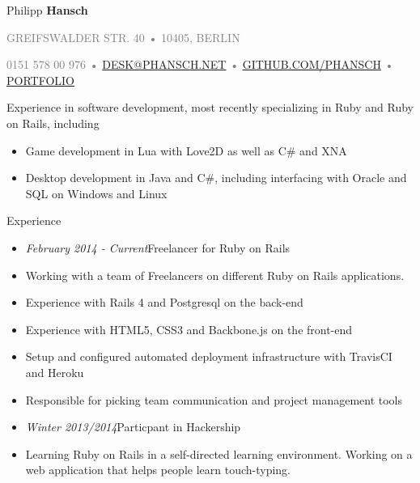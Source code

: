 \documentclass[12pt]{article}
\begin{document}
\thispagestyle{empty}



{\Huge Philipp \textbf{Hansch}}

{\footnotesize
  \textcolor{Gray}{
    \uppercase{Greifswalder Str. 40}
    •
    \uppercase{10405, Berlin}
  }

  \textcolor{Gray}{
    0151 578 00 976
    •
    \href{mailto:desk@phansch.net}{\uppercase{desk@phansch.net}}
    •
    \href{http://github.com/phansch}{\uppercase{github.com/phansch}}
    •
    \href{http://portfolio.phansch.net/\#folio-mid}{\uppercase{Portfolio}}
  }
}

\vspace{0.5cm}

Experience in software development, most recently specializing in Ruby and Ruby on Rails, including

\begin{itemize}
  \setlength{\itemsep}{0.1cm}
  \setlength{\parskip}{0.1cm}
  \item Game development in Lua with Love2D as well as C\# and XNA
  \item Desktop development in Java and C\#, including interfacing with Oracle and SQL on Windows and Linux
\end{itemize}
\vspace{0.5cm}

{\Large Experience}
\begin{itemize}
  \setlength{\itemsep}{0cm}
  \setlength{\parskip}{0cm}

  \item[] \emph{February 2014 - Current}\hfill Freelancer for Ruby on Rails
  \item[] Working with a team of Freelancers on different Ruby on Rails applications.
  \item[] Experience with Rails 4 and Postgresql on the back-end
  \item[] Experience with HTML5, CSS3 and Backbone.js on the front-end
  \item[] Setup and configured automated deployment infrastructure with TravisCI and Heroku
  \item[] Responsible for picking team communication and project management tools
\end{itemize}

\begin{itemize}
  \setlength{\itemsep}{0cm}
  \setlength{\parskip}{0cm}

  \item[] \emph{Winter 2013/2014}\hfill Particpant in Hackership
  \item[] Learning Ruby on Rails in a self-directed learning environment. Working on a web application that helps people learn touch-typing.
\end{itemize}
\end{document}
